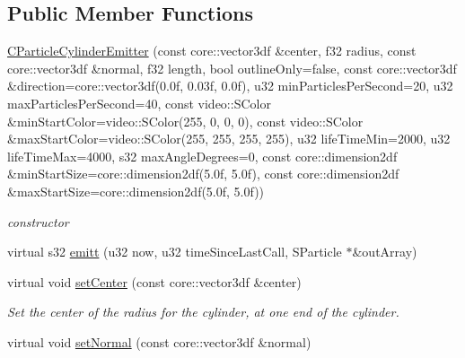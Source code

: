 \subsection*{Public Member Functions}
\begin{DoxyCompactItemize}
\item 
\hypertarget{classirr_1_1scene_1_1_c_particle_cylinder_emitter_a81d1dd0c08effaf6f70dd6a096ee92c0}{\hyperlink{classirr_1_1scene_1_1_c_particle_cylinder_emitter_a81d1dd0c08effaf6f70dd6a096ee92c0}{C\-Particle\-Cylinder\-Emitter} (const core\-::vector3df \&center, f32 radius, const core\-::vector3df \&normal, f32 length, bool outline\-Only=false, const core\-::vector3df \&direction=core\-::vector3df(0.\-0f, 0.\-03f, 0.\-0f), u32 min\-Particles\-Per\-Second=20, u32 max\-Particles\-Per\-Second=40, const video\-::\-S\-Color \&min\-Start\-Color=video\-::\-S\-Color(255, 0, 0, 0), const video\-::\-S\-Color \&max\-Start\-Color=video\-::\-S\-Color(255, 255, 255, 255), u32 life\-Time\-Min=2000, u32 life\-Time\-Max=4000, s32 max\-Angle\-Degrees=0, const core\-::dimension2df \&min\-Start\-Size=core\-::dimension2df(5.\-0f, 5.\-0f), const core\-::dimension2df \&max\-Start\-Size=core\-::dimension2df(5.\-0f, 5.\-0f))}\label{classirr_1_1scene_1_1_c_particle_cylinder_emitter_a81d1dd0c08effaf6f70dd6a096ee92c0}

\begin{DoxyCompactList}\small\item\em constructor \end{DoxyCompactList}\item 
virtual s32 \hyperlink{classirr_1_1scene_1_1_c_particle_cylinder_emitter_a95b0c6652cc6e12a1a291081764d4faf}{emitt} (u32 now, u32 time\-Since\-Last\-Call, S\-Particle $\ast$\&out\-Array)
\item 
\hypertarget{classirr_1_1scene_1_1_c_particle_cylinder_emitter_a719e53afcf980699db30783bfa5e9e17}{virtual void \hyperlink{classirr_1_1scene_1_1_c_particle_cylinder_emitter_a719e53afcf980699db30783bfa5e9e17}{set\-Center} (const core\-::vector3df \&center)}\label{classirr_1_1scene_1_1_c_particle_cylinder_emitter_a719e53afcf980699db30783bfa5e9e17}

\begin{DoxyCompactList}\small\item\em Set the center of the radius for the cylinder, at one end of the cylinder. \end{DoxyCompactList}\item 
\hypertarget{classirr_1_1scene_1_1_c_particle_cylinder_emitter_afd8d1ec3b478467c1dab457c5de8c6f5}{virtual void \hyperlink{classirr_1_1scene_1_1_c_particle_cylinder_emitter_afd8d1ec3b478467c1dab457c5de8c6f5}{set\-Normal} (const core\-::vector3df \&normal)}\label{classirr_1_1scene_1_1_c_particle_cylinder_emitter_afd8d1ec3b478467c1dab457c5de8c6f5}


\end{DoxyCompactItemize}
